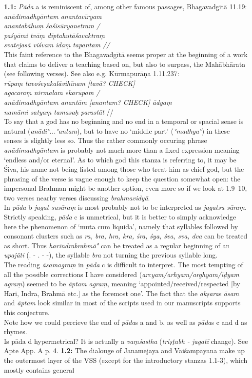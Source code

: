 \documentclass{article}
\newcommand{\vsnum}[1]{\textbf{#1}}
\newcommand{\skt}[1]{\textit{#1}}
\begin{document}
\vsnum{1.1:} \skt{Pāda} a is reminiscent of, among other famous passages, Bhagavadgītā 11.19: \\ \skt{anādimadhyāntam anantavīryam \\ anantabāhuṃ śaśisūryanetram / \\ paśyāmi tvāṃ dīptahutāśavaktraṃ \\ svatejasā viśvam idaṃ tapantam //} \\ This faint reference to the Bhagavadgītā seems proper at the beginning of a work that claims to deliver a teaching based on, but also to surpass, the Mahābhārata (see following verses). See also e.g. Kūrmapurāṇa 1.11.237:\\ \skt{rūpaṃ tavośeṣakalāvihīnam [tavā? CHECK]\\ agocaraṃ nirmalam ekarūpam / \\ anādimadhyāntam anantām [anantam? CHECK] ādyaṃ \\ namāmi satyaṃ tamasaḥ parastāt} // \\ To say that a god has no beginning and no end in a temporal or spacial sense is natural (\skt{anādi°...°antam}), but to have no `middle part' (\skt{°madhya°}) in these senses is slightly less so. Thus the rather commonly occuring phrase \skt{anādimadhyāntam} is probably not much more than a fixed expression meaning `endless and/or eternal'. As to which god this stanza is referring to, it may be Śiva, his name not being listed among those who treat him as chief god, but the phrasing of the verse is vague enough to keep the question somewhat open: the impersonal Brahman might be another option, even more so if we look at 1.9--10, two verses nearby verses discussing \skt{brahmavidyā}.  \\ In \skt{pāda} b \skt{jagat-susāraṃ} is most probably not to be interpreted as \skt{jagatsu sāraṃ}. \\ Strictly speaking, \skt{pāda} c is unmetrical, but it is better to simply acknowledge here the phenomenon of `muta cum liquida', namely that syllables followed by consonant clusters such as \skt{ra, bra, hra, kra, śra, śya, śva, sva, dva} can be treated as short. Thus \skt{harīndrabrahmā°} can be treated as a regular beginning of an \skt{upajāti} (. - . - -), the syllable \skt{bra} not turning the previous syllable long. \\ The reading \skt{āsamagraṃ} in \skt{pāda} c is difficult to interpret. The most tempting of all the possible corrections I have considered (\skt{arcyam/arhyam/arghyam/īḍyam agraṃ}) seemed to be \skt{āptam agraṃ}, meaning `appointed/received/respected [by Hari, Indra, Brahmā etc.] as the foremost one'. The fact that the \skt{akṣara}s \skt{āsam} and \skt{āptam} look similar in most of the scripts used in our manuscripts supports this conjecture. \\ Note how we could percieve the end of \skt{pāda}s a and b, as well as \skt{pāda}s c and d as rhymes. \\ Is pāda d hypermetrical? It is actually a \skt{vaṃśastha} (\skt{triṣṭubh - jagatī} change). See Apte App. A p. 4.  \vsnum{1.2: }The dialouge of Janamejaya and Vaiśampāyana make up the outermost layer of the VSS (except for the introductory stanzas 1.1-3), which mostly contains general 
\end{document}
